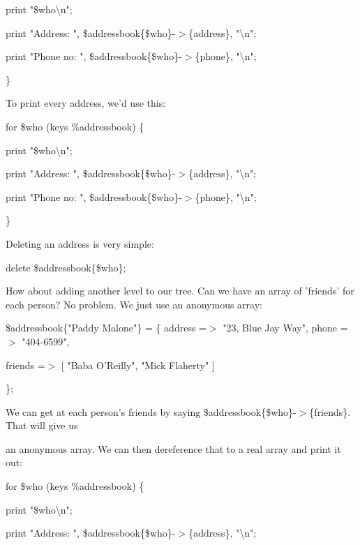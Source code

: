 \documentclass[a4paper,11pt]{book}
\begin{document}
\noindent print "\$who\textbackslash n";

\noindent print "Address:  ", \$addressbook\{\$who\}-$>$\{address\}, "\textbackslash n";

\noindent print "Phone no: ", \$addressbook\{\$who\}-$>$\{phone\}, "\textbackslash n";

\noindent \}

\noindent 

\noindent To print every address, we'd use this:

\noindent 

\noindent for \$who (keys \%addressbook) \{

\noindent print "\$who\textbackslash n";

\noindent print "Address:  ", \$addressbook\{\$who\}-$>$\{address\}, "\textbackslash n";

\noindent print "Phone no: ", \$addressbook\{\$who\}-$>$\{phone\}, "\textbackslash n";

\noindent \}

\noindent 

\noindent Deleting an address is very simple:

\noindent 

\noindent delete \$addressbook\{\$who\};

\noindent 

\noindent How about adding another level to our tree. Can we have an array of 'friends' for each person? No problem. We just use an anonymous array:

\noindent 

\noindent \$addressbook\{"Paddy Malone"\} = \{ address =$>$ "23, Blue Jay Way", phone =$>$ "404-6599",

\noindent friends =$>$ [ "Baba O'Reilly", "Mick Flaherty" ]

\noindent \};

\noindent 

\noindent 

\noindent We can get at each person's friends by saying \$addressbook\{\$who\}-$>$\{friends\}. That will give us

\noindent an anonymous array. We can then dereference that to a real array and print it out:

\noindent 

\noindent 

\noindent for \$who (keys \%addressbook) \{

\noindent print "\$who\textbackslash n";

\noindent print "Address:  ", \$addressbook\{\$who\}-$>$\{address\}, "\textbackslash n";
\end{document}
